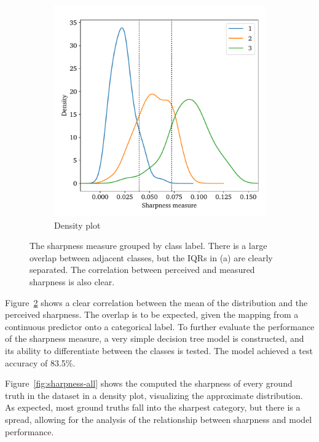 \begin{figure}[htbp]
\begin{subfigure}[t]{0.49\textwidth}
  \includegraphics[width=\textwidth]{figs/method/qden.pdf}
  \caption{Density plot}\label{fig:sharpness-qden}
\end{subfigure}
  \caption[Sharpness measure separability]{The sharpness measure grouped by class label.
There is a large overlap between adjacent classes, but the IQRs in (a) are clearly separated.
The correlation between perceived and measured sharpness is also clear.}\label{fig:sharpness}
\end{figure}

Figure~\ref{fig:sharpness} shows a clear correlation between the mean of the distribution and the perceived sharpness.
The overlap is to be expected, given the mapping from a continuous predictor onto a categorical label.
To further evaluate the performance of the sharpness measure, a very simple decision tree model is constructed, and its ability to differentiate between the classes is tested.
The model achieved a test accuracy of 83.5\%.

Figure~\ref{fig:sharpness-all} shows the computed the sharpness of every ground truth in the dataset in a density plot, visualizing the approximate distribution.
As expected, most ground truths fall into the sharpest category, but there is a spread, allowing for the analysis of the relationship between sharpness and model performance.

